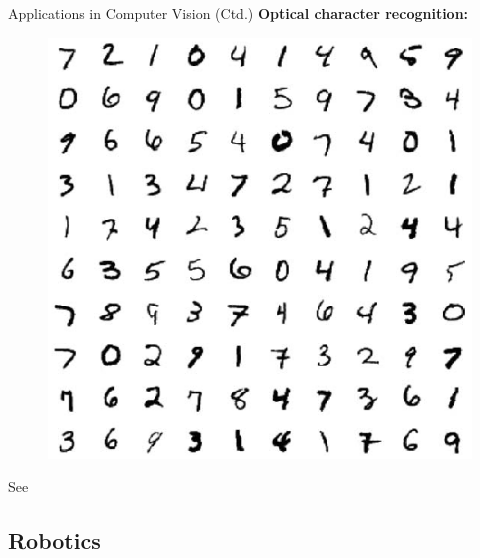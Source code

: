 \begin{frame}{Applications in Computer Vision (Ctd.)}{}
	\textbf{Optical character recognition:}
	\begin{figure}
		\includegraphics[scale=0.3]{01_intro_ml/02_img/digit_recognition}
	\end{figure}
	{\footnotesize See \href{https://www.youtube.com/watch?v=yxuRnBEczUU}{}}
\end{frame}


\subsection{Robotics}

